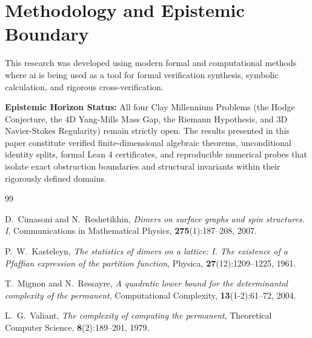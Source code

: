 \documentclass[11pt,a4paper]{article}
\theoremstyle{definition}
\begin{document}
\section{Methodology and Epistemic Boundary}
\noindent This research was developed using modern formal and computational methods where ai is being used as a tool for formal verification synthesis, symbolic calculation, and rigorous cross-verification.

\vspace{0.5em}
\noindent\textbf{Epistemic Horizon Status:} All four Clay Millennium Problems (the Hodge Conjecture, the 4D Yang-Mills Mass Gap, the Riemann Hypothesis, and 3D Navier-Stokes Regularity) remain strictly open. The results presented in this paper constitute verified finite-dimensional algebraic theorems, unconditional identity splits, formal Lean 4 certificates, and reproducible numerical probes that isolate exact obstruction boundaries and structural invariants within their rigorously defined domains.

\begin{thebibliography}{99}

D.~Cimasoni and N.~Reshetikhin,
\textit{Dimers on surface graphs and spin structures. I},
Communications in Mathematical Physics, \textbf{275}(1):187--208, 2007.

P.~W.~Kasteleyn,
\textit{The statistics of dimers on a lattice: I. The existence of a Pfaffian expression of the partition function},
Physica, \textbf{27}(12):1209--1225, 1961.

T.~Mignon and N.~Ressayre,
\textit{A quadratic lower bound for the determinantal complexity of the permanent},
Computational Complexity, \textbf{13}(1-2):61--72, 2004.

L.~G.~Valiant,
\textit{The complexity of computing the permanent},
Theoretical Computer Science, \textbf{8}(2):189--201, 1979.

\end{thebibliography}
\end{document}
